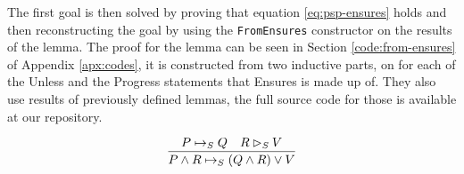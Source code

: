The first goal is then solved by proving that equation \ref{eq:psp-ensures} holds and then reconstructing the goal by using the \verb|FromEnsures| constructor on the results of the lemma. The proof for the lemma can be seen in Section \ref{code:from-ensures} of Appendix \ref{apx:codes}, it is constructed from two inductive parts, on for each of the Unless and the Progress statements that Ensures is made up of. They also use results of previously defined lemmas, the full source code for those is available at our repository\cite{orsi-formalization-github}.

\begin{equation}
    \label{eq:psp-ensures}
    \infer{P \land R \mapsto_S (Q \land R) \lor V}{P \mapsto_S Q & R \rhd_S V}
\end{equation}

\begin{code}
    \>[2]\AgdaSpace{}%
    \AgdaSymbol{:}\AgdaSpace{}%
    \AgdaSymbol{((}\AgdaSpace{}%
    \AgdaOperator{\AgdaFunction{↪[}}\AgdaSpace{}%
    \AgdaSpace{}%
    \AgdaOperator{\AgdaFunction{]}}\AgdaSpace{}%
    \AgdaSymbol{)}\AgdaSpace{}%
    \AgdaSpace{}%
    \AgdaSymbol{(}\AgdaSpace{}%
    \AgdaOperator{\AgdaFunction{▷[}}\AgdaSpace{}%
    \AgdaSpace{}%
    \AgdaOperator{\AgdaFunction{]}}\AgdaSpace{}%
    \AgdaSymbol{))}\AgdaSpace{}%
    \AgdaSpace{}%
    \AgdaSymbol{(}\AgdaSpace{}%
    \AgdaSpace{}%
    \AgdaSymbol{)}\AgdaSpace{}%
    \AgdaOperator{\AgdaFunction{↪[}}\AgdaSpace{}%
    \AgdaSpace{}%
    \AgdaOperator{\AgdaFunction{]}}\AgdaSpace{}%
    \AgdaSymbol{((}\AgdaSpace{}%
    \AgdaSpace{}%
    \AgdaSymbol{)}\AgdaSpace{}%
    \AgdaSpace{}%
    \AgdaSymbol{)}\<%
    \\
    \\[\AgdaEmptyExtraSkip]%
    \>[2]\AgdaSpace{}%
    \AgdaSymbol{(}\AgdaSpace{}%
    \AgdaSpace{}%
    \AgdaOperator{\AgdaInductiveConstructor{,}}\AgdaSpace{}%
    \AgdaSymbol{)}\AgdaSpace{}%
    \AgdaSymbol{=}\AgdaSpace{}%
    \AgdaSpace{}%
    \AgdaSymbol{(}\AgdaSpace{}%

\end{code}
